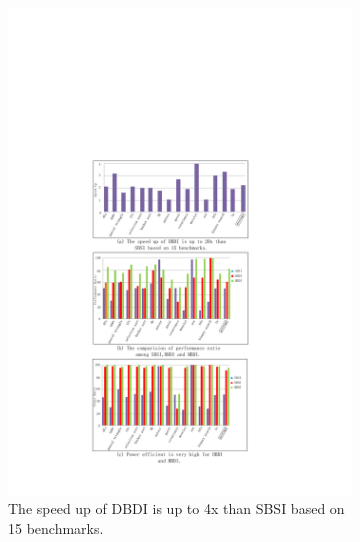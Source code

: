 \documentclass[10pt, conference, compsocconf]{IEEEtran}
\begin{document}
\begin{figure}[t!]
	\centering
	\begin{subfigure}[b]{0.41\textwidth}
		\centering
		\includegraphics[width=\textwidth]{fi/result_1.pdf}
		\caption{The speed up of DBDI is up to 4x than SBSI based on 15 benchmarks.}
		\label{fig:a}
	\end{subfigure}
	\begin{subfigure}[b]{0.41\textwidth}
		\centering

\end{subfigure}
\end{figure}
\end{document}
